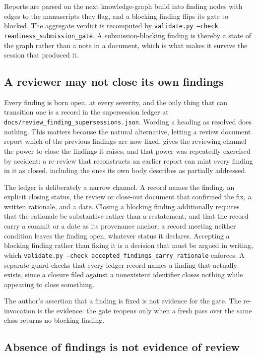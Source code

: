 \documentclass[11pt]{article}
\begin{document}
Reports are parsed on the next knowledge-graph build into finding
nodes with edges to the manuscripts they flag, and a blocking finding
flips its gate to blocked. The aggregate verdict is recomputed by
\texttt{validate.py --check readiness\_submission\_gate}. A
submission-blocking finding is thereby a state of the graph rather
than a note in a document, which is what makes it survive the session
that produced it.

\subsection{A reviewer may not close its own findings}

Every finding is born open, at every severity, and the only thing
that can transition one is a record in the supersession ledger at
\texttt{docs/review\_finding\_supersessions.json}. Wording a heading
as resolved does nothing. This matters because the natural
alternative, letting a review document report which of the previous
findings are now fixed, gives the reviewing channel the power to
close the findings it raises, and that power was repeatedly exercised
by accident: a re-review that reconstructs an earlier report can mint
every finding in it as closed, including the ones its own body
describes as partially addressed.

The ledger is deliberately a narrow channel. A record names the
finding, an explicit closing status, the review or close-out document
that confirmed the fix, a written rationale, and a date. Closing a
blocking finding additionally requires that the rationale be
substantive rather than a restatement, and that the record carry a
commit or a date as its provenance anchor; a record meeting neither
condition leaves the finding open, whatever status it declares.
Accepting a blocking finding rather than fixing it is a decision that
must be argued in writing, which
\texttt{validate.py --check accepted\_findings\_carry\_rationale}
enforces. A separate guard checks that every ledger record names a
finding that actually exists, since a closure filed against a
nonexistent identifier closes nothing while appearing to close
something.

The author's assertion that a finding is fixed is not evidence for
the gate. The re-invocation is the evidence: the gate reopens only
when a fresh pass over the same class returns no blocking finding.

\subsection{Absence of findings is not evidence of review}
\end{document}
